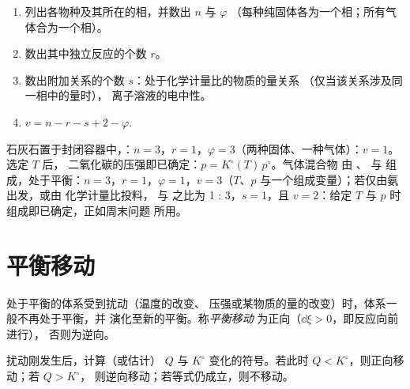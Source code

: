 \begin{method}[计算自由度]\label{met:b2:equilibrium-shifts:variance}
\begin{enumerate}
  \item 列出各物种及其所在的相，并数出 $n$ 与 $\varphi$
        （每种纯固体各为一个相；所有气体合为一个相）。
  \item 数出其中独立反应的个数 $r$。
  \item 数出附加关系的个数 $s$：处于化学计量比的物质的量关系
        （仅当该关系涉及同一相中的量时），
        离子溶液的电中性。
  \item $v = n - r - s + 2 - \varphi$.
\end{enumerate}
\end{method}

\begin{example}[三个自由度的计算]\label{ex:b2:equilibrium-shifts:variances}
石灰石置于封闭容器中，：$n = 3$，$r =
1$，$\varphi = 3$（两种固体、一种气体）：$v = 1$。选定 $T$ 后，
二氧化碳的压强即已确定：$p = K^\circ(T)\,p^\circ$。气体混合物
由 、 与  组成，处于平衡：$n = 3$，$r = 1$，$\varphi = 1$，$v
= 3$（$T$、$p$ 与一个组成变量）；若仅由氨出发，或由
化学计量比投料， 与  之比为 1 : 3，$s = 1$，且
$v = 2$：给定 $T$ 与 $p$ 时组成即已确定，正如周末问题
所用。
\end{example}

\section{平衡移动}

\begin{definition}[平衡移动]\label{def:b2:equilibrium-shifts:shift}
处于平衡的体系受到扰动（温度的改变、
压强或某物质的量的改变）时，体系一般不再处于平衡，并
演化至新的平衡。称\emph{平衡移动}
为正向（$\dd\xi > 0$，即反应向前进行），
否则为逆向。
\end{definition}

\begin{method}[预测平衡移动方向]\label{met:b2:equilibrium-shifts:predict-shift}
扰动刚发生后，计算（或估计）
$Q$ 与 $K^\circ$ 变化的符号。若此时 $Q < K^\circ$，则正向移动；若 $Q > K^\circ$，
则逆向移动；若等式仍成立，则不移动。
\end{method}

